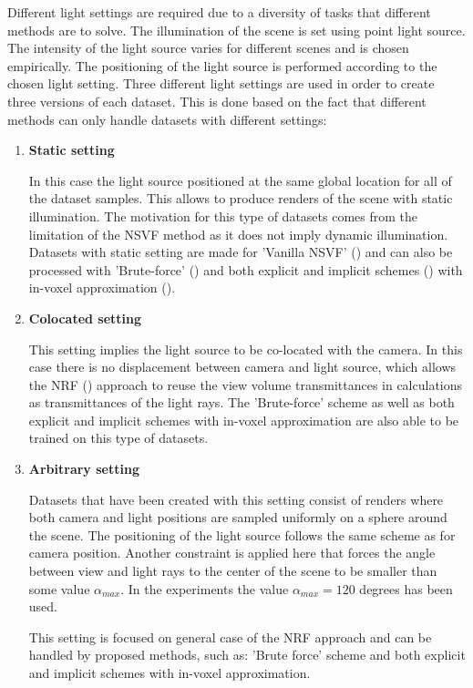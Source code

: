 Different light settings are required due to a diversity of tasks that different methods are to solve.
The illumination of the scene is set using point light source.
The intensity of the light source varies for different scenes and is chosen empirically.
The positioning of the light source is performed according to the chosen light setting.
Three different light settings are used in order to create three versions of each dataset.
This is done based on the fact that different methods can only handle datasets with different settings:
\begin{enumerate}
    \item \textbf{Static setting}
    
    In this case the light source positioned at the same global location for all of the dataset samples.
    This allows to produce renders of the scene with static illumination.
    The motivation for this type of datasets comes from the limitation of the NSVF method
    as it does not imply dynamic illumination.
    Datasets with static setting are made for 'Vanilla NSVF' (\cite{liu2021neural})
    and can also be processed with 'Brute-force' ()
    and both explicit and implicit schemes ()
    with in-voxel approximation ().
    
    \item \textbf{Colocated setting}
    
    This setting implies the light source to be co-located with the camera.
    In this case there is no displacement between camera and light source,
    which allows the NRF (\cite{bi2020neural}) approach to reuse the view volume transmittances
    in calculations as transmittances of the light rays.
    The 'Brute-force' scheme as well as both explicit and implicit schemes
    with in-voxel approximation are also able to be trained on this type of datasets.
    
    \item \textbf{Arbitrary setting}
    
    Datasets that have been created with this setting consist of renders
    where both camera and light positions are sampled uniformly on a sphere around the scene.
    The positioning of the light source follows the same scheme as for camera position.
    Another constraint is applied here that forces the angle
    between view and light rays to the center of the scene to be smaller
    than some value $\alpha_{max}$.
    In the experiments the value $\alpha_{max} = 120$ degrees has been used.
    
    This setting is focused on general case of the NRF approach
    and can be handled by proposed methods, such as: 'Brute force' scheme
    and both explicit and implicit schemes with in-voxel approximation.
\end{enumerate}






